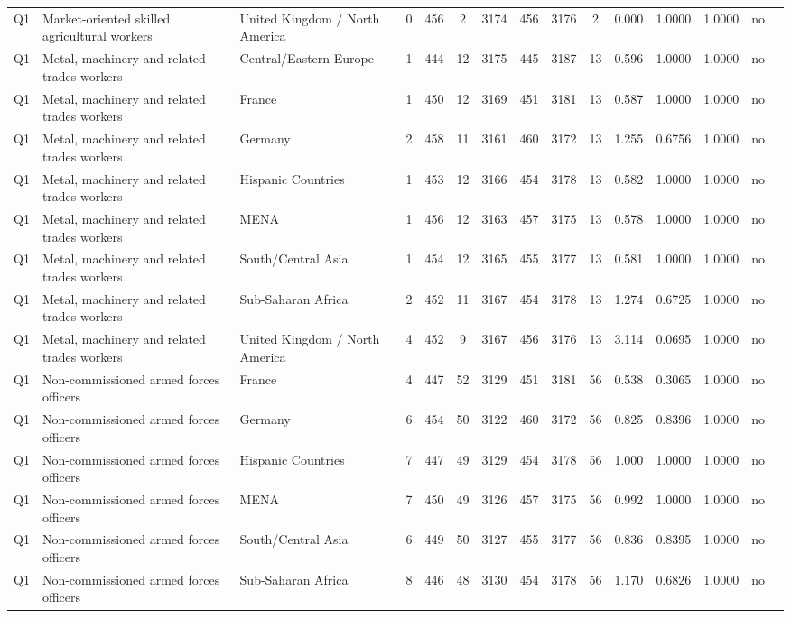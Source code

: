 \begin{longtable}{lllrcccccccccll}
Q1 & Market-oriented skilled agricultural workers & United Kingdom / North America & 0 & 456 & 2 & 3174 & 456 & 3176 & 2 & 0.000 & 1.0000 & 1.0000 & no \\
Q1 & Metal, machinery and related trades workers & Central/Eastern Europe & 1 & 444 & 12 & 3175 & 445 & 3187 & 13 & 0.596 & 1.0000 & 1.0000 & no \\
Q1 & Metal, machinery and related trades workers & France & 1 & 450 & 12 & 3169 & 451 & 3181 & 13 & 0.587 & 1.0000 & 1.0000 & no \\
Q1 & Metal, machinery and related trades workers & Germany & 2 & 458 & 11 & 3161 & 460 & 3172 & 13 & 1.255 & 0.6756 & 1.0000 & no \\
Q1 & Metal, machinery and related trades workers & Hispanic Countries & 1 & 453 & 12 & 3166 & 454 & 3178 & 13 & 0.582 & 1.0000 & 1.0000 & no \\
Q1 & Metal, machinery and related trades workers & MENA & 1 & 456 & 12 & 3163 & 457 & 3175 & 13 & 0.578 & 1.0000 & 1.0000 & no \\
Q1 & Metal, machinery and related trades workers & South/Central Asia & 1 & 454 & 12 & 3165 & 455 & 3177 & 13 & 0.581 & 1.0000 & 1.0000 & no \\
Q1 & Metal, machinery and related trades workers & Sub-Saharan Africa & 2 & 452 & 11 & 3167 & 454 & 3178 & 13 & 1.274 & 0.6725 & 1.0000 & no \\
Q1 & Metal, machinery and related trades workers & United Kingdom / North America & 4 & 452 & 9 & 3167 & 456 & 3176 & 13 & 3.114 & 0.0695 & 1.0000 & no \\
Q1 & Non-commissioned armed forces officers & France & 4 & 447 & 52 & 3129 & 451 & 3181 & 56 & 0.538 & 0.3065 & 1.0000 & no \\
Q1 & Non-commissioned armed forces officers & Germany & 6 & 454 & 50 & 3122 & 460 & 3172 & 56 & 0.825 & 0.8396 & 1.0000 & no \\
Q1 & Non-commissioned armed forces officers & Hispanic Countries & 7 & 447 & 49 & 3129 & 454 & 3178 & 56 & 1.000 & 1.0000 & 1.0000 & no \\
Q1 & Non-commissioned armed forces officers & MENA & 7 & 450 & 49 & 3126 & 457 & 3175 & 56 & 0.992 & 1.0000 & 1.0000 & no \\
Q1 & Non-commissioned armed forces officers & South/Central Asia & 6 & 449 & 50 & 3127 & 455 & 3177 & 56 & 0.836 & 0.8395 & 1.0000 & no \\
Q1 & Non-commissioned armed forces officers & Sub-Saharan Africa & 8 & 446 & 48 & 3130 & 454 & 3178 & 56 & 1.170 & 0.6826 & 1.0000 & no \\

\end{longtable}
